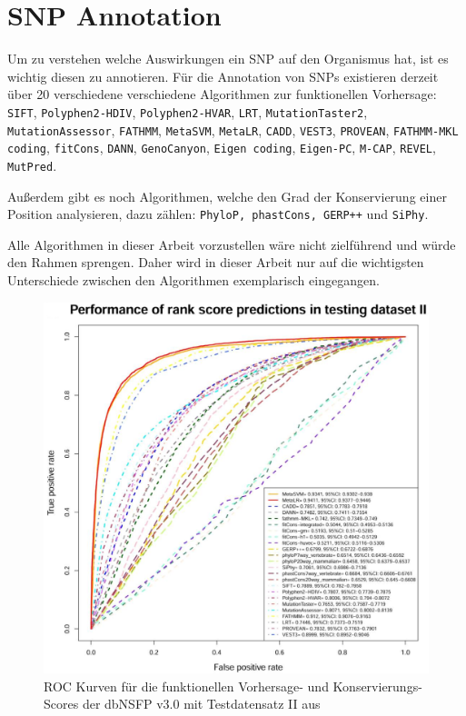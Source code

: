 \section{SNP Annotation}
\begin{sloppypar}
Um zu verstehen welche Auswirkungen ein \ac{SNP} auf den Organismus hat, ist es wichtig diesen zu annotieren. 
Für die Annotation von \ac{SNPs} existieren derzeit über 20 verschiedene verschiedene Algorithmen zur funktionellen Vorhersage: \texttt{SIFT}, \texttt{Polyphen2-HDIV}, \texttt{Polyphen2-HVAR}, \texttt{LRT}, \texttt{MutationTaster2}, \texttt{MutationAssessor}, \texttt{FATHMM}, \texttt{MetaSVM}, \texttt{MetaLR}, \texttt{CADD}, \texttt{VEST3}, \texttt{PROVEAN}, \texttt{FATHMM-MKL coding}, \texttt{fitCons}, \texttt{DANN}, \texttt{GenoCanyon}, \texttt{Eigen coding}, \texttt{Eigen-PC}, \texttt{M-CAP}, \texttt{REVEL}, \texttt{MutPred}. 
\end{sloppypar}
Außerdem gibt es noch Algorithmen, welche den Grad der Konservierung einer Position analysieren, dazu zählen: \texttt{PhyloP, phastCons, GERP++} und \texttt{SiPhy}.

Alle Algorithmen in dieser Arbeit vorzustellen wäre nicht zielführend und würde den Rahmen sprengen. Daher wird in dieser Arbeit nur auf die wichtigsten Unterschiede zwischen den Algorithmen exemplarisch eingegangen. 

\begin{figure}
\centering
\includegraphics[width=.95\textwidth]{images/compared_prediction_scores.png}
\caption{\ac{ROC} Kurven für die funktionellen Vorhersage- und Konservierungs- Scores der dbNSFP v3.0 mit Testdatensatz II aus\cite{Liu.2016}}
\label{fig:comp_scores}
\end{figure}

